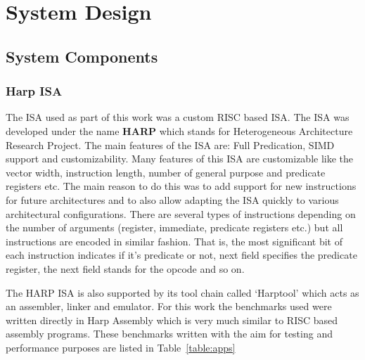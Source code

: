 \setcounter{equation}{0}

\chapter{System Design}
\label{chap: System Design}

\section{System Components}
\subsection{Harp ISA}
The ISA used as part of this work was a custom RISC based ISA. The ISA was developed under the name \textbf{HARP} which stands for Heterogeneous Architecture Research Project. %
The main features of the ISA are: Full Predication, SIMD support and customizability. Many features of this ISA are customizable like the vector width, instruction length, number of general purpose and predicate registers etc. The main reason to do this was to add support for new instructions for future architectures and to also allow adapting the ISA quickly to various architectural configurations. There are several types of instructions depending on the number of arguments (register, immediate, predicate registers etc.) but all instructions are encoded in similar fashion. That is, the most significant bit of each instruction indicates if it's predicate or not, next field specifies the predicate register, the next field stands for the opcode and so on. 

The HARP ISA is also supported by its tool chain called `Harptool' which acts as an assembler, linker and emulator. For this work the benchmarks used were written directly in Harp Assembly which is very much similar to RISC based assembly programs. These benchmarks written with the aim for testing and performance purposes are listed in Table~\ref{table:apps}

%

